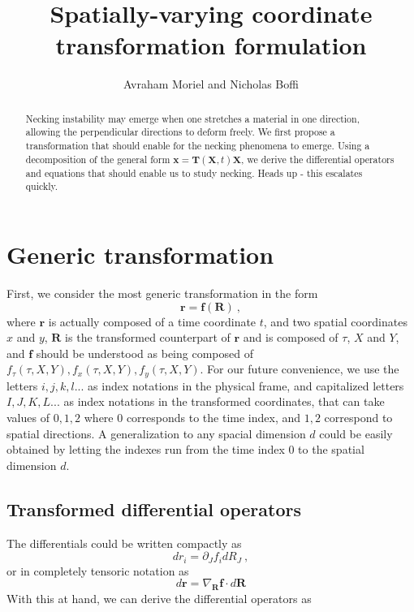 \documentclass[12pt,a4paper]{article}
\begin{document}
\title{Spatially-varying coordinate transformation formulation}
\author{Avraham Moriel and Nicholas Boffi}
\maketitle


\begin{abstract}
Necking instability may emerge when one stretches a material in one direction, allowing the perpendicular directions to deform freely. We first propose a transformation that should enable for the necking phenomena to emerge. Using a decomposition of the general form $\bm{x}=\bm{T}\left(\bm{X},t\right) \bm{X}$, we derive the differential operators and equations that should enable us to study necking. Heads up - this escalates quickly.
\end{abstract}
\section{Generic transformation}\label{se:generic}
First, we consider the most generic transformation in the form
\begin{equation}\label{eq:trans_generic}
  \bm{r} = \bm{f}\left(\bm{R}\right) \ ,
\end{equation}
where $\bm{r}$ is actually composed of a time coordinate $t$, and two spatial coordinates $x$ and $y$, $\bm{R}$ is the transformed counterpart of $\bm{r}$ and is composed of $\tau$, $X$ and $Y$, and $\bm{f}$ should be understood as being composed of $f_\tau\left(\tau,X,Y\right),f_x\left(\tau,X,Y\right), f_y\left(\tau,X,Y\right)$. For our future convenience, we use the letters $i,j,k,l...$ as index notations in the physical frame, and capitalized letters $I,J,K,L...$ as index notations in the transformed coordinates, that can take values of $0,1,2$ where $0$ corresponds to the time index, and $1,2$ correspond to spatial directions. A generalization to any spacial dimension $d$ could be easily obtained by letting the indexes run from the time index $0$ to the spatial dimension $d$.
\subsection{Transformed differential operators} \label{sse:T_diff_op}
The differentials could be written compactly as
\begin{equation}\label{eq:diff_generic_explicit}
  dr_i = \partial_J f_i dR_J \ ,
\end{equation}
or in completely tensoric notation as
\begin{equation}\label{eq:diff_generic_tensor}
  d\bm{r}= \nabla_{\bm{R}} \bm{f}\cdot d\bm{R}
\end{equation}
With this at hand, we can derive the differential operators as
\end{document}
